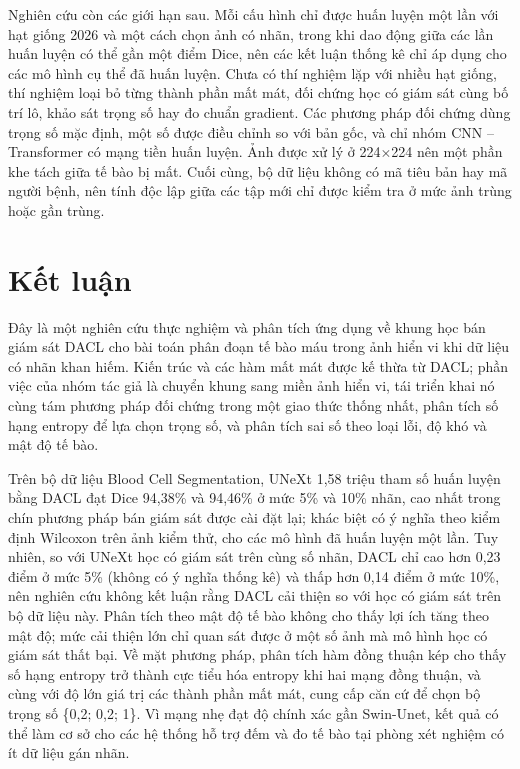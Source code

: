 \documentclass{IEEEtran}
\begin{document}
Nghiên cứu còn các giới hạn sau. Mỗi cấu hình chỉ được huấn luyện một lần với hạt giống 2026 và một cách chọn ảnh có nhãn, trong khi dao động giữa các lần huấn luyện có thể gần một điểm Dice, nên các kết luận thống kê chỉ áp dụng cho các mô hình cụ thể đã huấn luyện. Chưa có thí nghiệm lặp với nhiều hạt giống, thí nghiệm loại bỏ từng thành phần mất mát, đối chứng học có giám sát cùng bố trí lô, khảo sát trọng số hay đo chuẩn gradient. Các phương pháp đối chứng dùng trọng số mặc định, một số được điều chỉnh so với bản gốc, và chỉ nhóm CNN -- Transformer có mạng tiền huấn luyện. Ảnh được xử lý ở 224$\times$224 nên một phần khe tách giữa tế bào bị mất. Cuối cùng, bộ dữ liệu không có mã tiêu bản hay mã người bệnh, nên tính độc lập giữa các tập mới chỉ được kiểm tra ở mức ảnh trùng hoặc gần trùng.

\section{Kết luận}
\label{sec:conclusion}

Đây là một nghiên cứu thực nghiệm và phân tích ứng dụng về khung học bán giám sát DACL cho bài toán phân đoạn tế bào máu trong ảnh hiển vi khi dữ liệu có nhãn khan hiếm. Kiến trúc và các hàm mất mát được kế thừa từ DACL; phần việc của nhóm tác giả là chuyển khung sang miền ảnh hiển vi, tái triển khai nó cùng tám phương pháp đối chứng trong một giao thức thống nhất, phân tích số hạng entropy để lựa chọn trọng số, và phân tích sai số theo loại lỗi, độ khó và mật độ tế bào.

Trên bộ dữ liệu Blood Cell Segmentation, UNeXt 1,58 triệu tham số huấn luyện bằng DACL đạt Dice 94,38\% và 94,46\% ở mức 5\% và 10\% nhãn, cao nhất trong chín phương pháp bán giám sát được cài đặt lại; khác biệt có ý nghĩa theo kiểm định Wilcoxon trên ảnh kiểm thử, cho các mô hình đã huấn luyện một lần. Tuy nhiên, so với UNeXt học có giám sát trên cùng số nhãn, DACL chỉ cao hơn 0,23 điểm ở mức 5\% (không có ý nghĩa thống kê) và thấp hơn 0,14 điểm ở mức 10\%, nên nghiên cứu không kết luận rằng DACL cải thiện so với học có giám sát trên bộ dữ liệu này. Phân tích theo mật độ tế bào không cho thấy lợi ích tăng theo mật độ; mức cải thiện lớn chỉ quan sát được ở một số ảnh mà mô hình học có giám sát thất bại. Về mặt phương pháp, phân tích hàm đồng thuận kép cho thấy số hạng entropy trở thành cực tiểu hóa entropy khi hai mạng đồng thuận, và cùng với độ lớn giá trị các thành phần mất mát, cung cấp căn cứ để chọn bộ trọng số \{0,2; 0,2; 1\}. Vì mạng nhẹ đạt độ chính xác gần Swin-Unet, kết quả có thể làm cơ sở cho các hệ thống hỗ trợ đếm và đo tế bào tại phòng xét nghiệm có ít dữ liệu gán nhãn.
\end{document}
